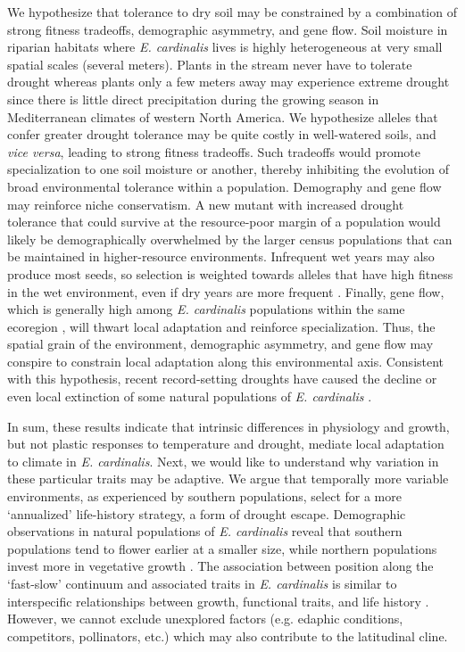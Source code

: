 \documentclass[11pt, oneside]{article}
\begin{document}
We hypothesize that tolerance to dry soil may be constrained by a combination of strong fitness tradeoffs, demographic asymmetry, and gene flow. Soil moisture in riparian habitats where \textit{E. cardinalis} lives is highly heterogeneous at very small spatial scales (several meters). Plants in the stream never have to tolerate drought whereas plants only a few meters away may experience extreme drought since there is little direct precipitation during the growing season in Mediterranean climates of western North America. We hypothesize alleles that confer greater drought tolerance may be quite costly in well-watered soils, and \textit{vice versa}, leading to strong fitness tradeoffs. Such tradeoffs would promote specialization to one soil moisture or another, thereby inhibiting the evolution of broad environmental tolerance within a population. Demography and gene flow may reinforce niche conservatism. A new mutant with increased drought tolerance that could survive at the resource-poor margin of a population would likely be demographically overwhelmed by the larger census populations that can be maintained in higher-resource environments. Infrequent wet years may also produce most seeds, so selection is weighted towards alleles that have high fitness in the wet environment, even if dry years are more frequent \citep{Templeton_Levin_1979, Brown_Venable_1986}. Finally, gene flow, which is generally high among \textit{E. cardinalis} populations within the same ecoregion \citep{Paul_etal_2016}, will thwart local adaptation and reinforce specialization. Thus, the spatial grain of the environment, demographic asymmetry, and gene flow may conspire to constrain local adaptation along this environmental axis. Consistent with this hypothesis, recent record-setting droughts have caused the decline or even local extinction of some natural populations of \textit{E. cardinalis} \citep{Sheth_Angert_2017}.

In sum, these results indicate that intrinsic differences in physiology and growth, but not plastic responses to temperature and drought, mediate local adaptation to climate in \textit{E. cardinalis}. Next, we would like to understand why variation in these particular traits may be adaptive. We argue that temporally more variable environments, as experienced by southern populations, select for a more `annualized' life-history strategy, a form of drought escape. Demographic observations in natural populations of \textit{E. cardinalis} reveal that southern populations tend to flower earlier at a smaller size, while northern populations invest more in vegetative growth \citep{Sheth_Angert_2017}. The association between position along the `fast-slow' continuum and associated traits in \textit{E. cardinalis} is similar to interspecific relationships between growth, functional traits, and life history \citep{Adler_etal_2014, Salguero-Gomez_etal_2016}. However, we cannot exclude unexplored factors (e.g. edaphic conditions, competitors, pollinators, etc.) which may also contribute to the latitudinal cline. 
\end{document}
